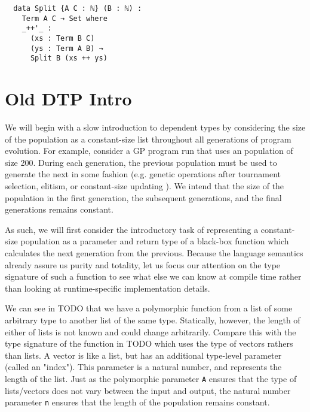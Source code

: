 \documentclass{acm_proc_article-sp}
\begin{document}
\begin{verbatim}
  data Split {A C : ℕ} (B : ℕ) :
    Term A C → Set where
    _++'_ :
      (xs : Term B C)
      (ys : Term A B) →
      Split B (xs ++ ys)
\end{verbatim}



\section{Old DTP Intro}

We will begin with a slow introduction to dependent types by
considering the size of the population as a constant-size list
throughout all generations of program evolution. For example, consider
a GP program run that uses an population of size 200. During each
generation, the previous population must be used to generate the next
in some fashion (e.g. genetic operations after tournament selection,
elitism, or constant-size updating \cite{montana:strongtree}). We
intend that the size of the population in the first generation, the
subsequent generations, and the final generations remains
constant.


As such, we will first consider the introductory task of representing
a constant-size population as a parameter and return type of a
black-box function which calculates the next generation from the
previous. Because the language semantics already assure us purity and
totality, let us focus our attention on the type signature of such a
function to see what else we can know at compile time rather than
looking at runtime-specific implementation details.


We can see in TODO
that we have a polymorphic function from a list of some arbitrary type
to another list of the same type. Statically, however, the length of
either of lists is not known and could change arbitrarily. Compare
this with the type signature of the function in TODO which uses the
type of vectors rathers than lists. A vector is like a list, but has
an additional type-level parameter (called an "index"). This parameter
is a natural number, and represents the length of the list. Just as
the polymorphic parameter \texttt{A} ensures that the type of lists/vectors
does not vary between the input and output, the natural number
parameter \texttt{n} ensures that the length of the population remains
constant.
\end{document}
